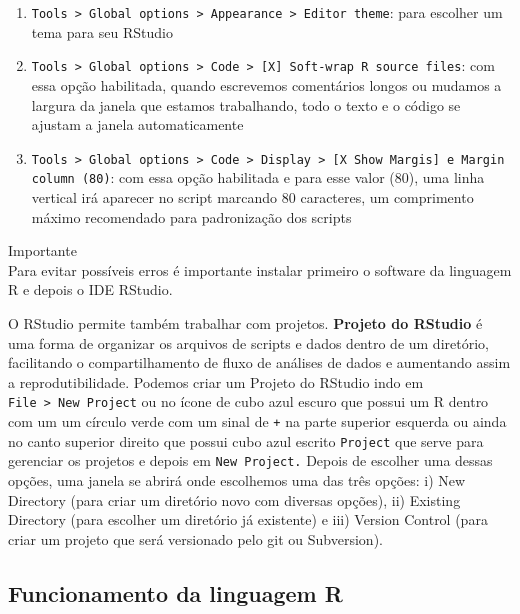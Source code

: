 \documentclass[
]{article}
\providecommand{\tightlist}{%
  \setlength{\itemsep}{0pt}\setlength{\parskip}{0pt}}
\begin{document}
\begin{enumerate}
\def\labelenumi{\arabic{enumi}.}
\tightlist
\item
  \texttt{Tools\ \textgreater{}\ Global\ options\ \textgreater{}\ Appearance\ \textgreater{}\ Editor\ theme}: para escolher um tema para seu RStudio
\item
  \texttt{Tools\ \textgreater{}\ Global\ options\ \textgreater{}\ Code\ \textgreater{}\ {[}X{]}\ Soft-wrap\ R\ source\ files}: com essa opção habilitada, quando escrevemos comentários longos ou mudamos a largura da janela que estamos trabalhando, todo o texto e o código se ajustam a janela automaticamente
\item
  \texttt{Tools\ \textgreater{}\ Global\ options\ \textgreater{}\ Code\ \textgreater{}\ Display\ \textgreater{}\ {[}X\ Show\ Margis{]}\ e\ Margin\ column\ (80)}: com essa opção habilitada e para esse valor (80), uma linha vertical irá aparecer no script marcando 80 caracteres, um comprimento máximo recomendado para padronização dos scripts
\end{enumerate}

Importante \\
Para evitar possíveis erros é importante instalar primeiro o software da linguagem R e depois o IDE RStudio.

O RStudio permite também trabalhar com projetos. \textbf{Projeto do RStudio} é uma forma de organizar os arquivos de scripts e dados dentro de um diretório, facilitando o compartilhamento de fluxo de análises de dados e aumentando assim a reprodutibilidade. Podemos criar um Projeto do RStudio indo em \texttt{File\ \textgreater{}\ New\ Project} ou no ícone de cubo azul escuro que possui um R dentro com um um círculo verde com um sinal de \texttt{+} na parte superior esquerda ou ainda no canto superior direito que possui cubo azul escrito \texttt{Project} que serve para gerenciar os projetos e depois em \texttt{New\ Project.} Depois de escolher uma dessas opções, uma janela se abrirá onde escolhemos uma das três opções: i) New Directory (para criar um diretório novo com diversas opções), ii) Existing Directory (para escolher um diretório já existente) e iii) Version Control (para criar um projeto que será versionado pelo git ou Subversion).

\hypertarget{funcionamento-da-linguagem-r}{%
\subsection{Funcionamento da linguagem R}\label{funcionamento-da-linguagem-r}}
\end{document}
